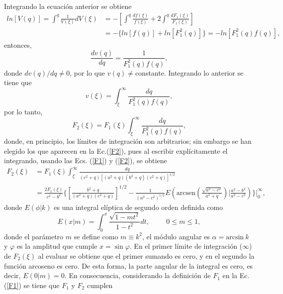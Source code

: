\documentclass[paper=letter, fontsize=12pt,]{article}
\begin{document}
Integrando la ecuación anterior se obtiene
\begin{align}
    ln[V(q)]=\int^{q}\frac{1}{V(\xi)}dV(\xi)&=-\left[\int^q \frac{df(\xi)}{f(\xi)}+2\int^q \frac{dF_1(\xi)}{F_1(\xi)}\right]\nonumber\\
    &=-\{ln[f(q)]+ln[F_1^2(q)]\}=-ln[F_1^2(q)f(q)],
\end{align}
entonces,
\begin{equation}
    \frac{dv(q)}{dq}=\frac{1}{F_1^2(q)f(q)},
\end{equation}
donde $dv(q)/dq\neq 0$, por lo que $v(q)\neq $constante. Integrando lo anterior se tiene que
\begin{equation}
    v(\xi)=\int_{\xi}^{\infty}\frac{dq}{F_1^2(q)f(q)},
\end{equation}
por lo tanto, 
\begin{equation}
  F_2(\xi)=F_1(\xi)\int_{\xi}^{\infty}\frac{dq}{F_1^2(q)f(q)},
  \label{F2}
\end{equation}
donde, en principio, los límites de integración son arbitrarios; sin embargo se han elegido los que aparecen
en la Ec.(\ref{F2}), pues al escribir explícitamente el integrando, usando las Ecs. (\ref{F1}) y (\ref{F2}), se obtiene
\begin{align}
    F_2(\xi)&=F_1(\xi)\int_{\xi}^{\infty}\frac{dq}{(c^2+q)[(a^2+q)(b^2+q)(c^2+q)]^{1/2}}\nonumber\\
    &=\frac{2F_1(\xi)}{c^2-b^2}\Bigg\{\left[\frac{b^2+q}{(a^2+q)(c^2+q)}\right]^{1/2}-\frac{1}{(a^2-c^2)^{1/2}}E\left(\mbox{arcsen}\left(\frac{\sqrt{a^2-c^2}}{a^2+q}\right)\Bigg|\frac{a^2-b^2}{a^2-c^2}\right)\Bigg\}\Bigg|_0^{\infty},
\end{align}
donde $E(\phi|k)$ es una integral elíptica de segundo orden definida como \cite{Abramo}
\begin{equation}
    E(x|m)=\int_{0}^x\frac{\sqrt{1-mt^2}}{1-t^2}dt,\hspace{1cm}0\leq m\leq 1,
\end{equation}
donde el parámetro $m$ se define como $m\equiv k^2$, el módulo angular es $\alpha=\mbox{arcsin}\:k$ y $\varphi$ es la amplitud que cumple $x=\sin\varphi$. En el primer límite de integración ($\infty$) de $F_2(\xi)$ al evaluar se obtiene que el primer sumando es cero, y en el segundo la función arcoseno es cero. De esta forma, la parte angular de la integral es cero, es decir, $E(0|m)=0$. En consecuencia, considerando la definición de $F_1$ en la Ec.(\ref{F1}) se tiene que $F_1$ y $F_2$ cumplen
\end{document}
